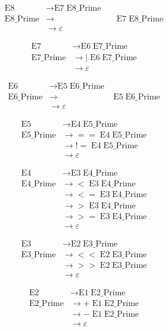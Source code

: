 \begin{align*}
\text{E8}
  &\to \text{E7}\;\text{E8\_Prime}\\[6pt]
\text{E8\_Prime}
  &\to &&\;\text{E7}\;\text{E8\_Prime}\\
  &\to \varepsilon
\end{align*}

\begin{align*}
\text{E7}
  &\to \text{E6}\;\text{E7\_Prime}\\[6pt]
\text{E7\_Prime}
  &\to |\;\text{E6}\;\text{E7\_Prime}\\
  &\to \varepsilon
\end{align*}

\begin{align*}
\text{E6}
  &\to \text{E5}\;\text{E6\_Prime}\\[6pt]
\text{E6\_Prime}
  &\to &\;\text{E5}\;\text{E6\_Prime}\\
  &\to \varepsilon
\end{align*}

\begin{align*}
\text{E5}
  &\to \text{E4}\;\text{E5\_Prime}\\[6pt]
\text{E5\_Prime}
  &\to ==\;\text{E4}\;\text{E5\_Prime}\\
  &\to !=\;\text{E4}\;\text{E5\_Prime}\\
  &\to \varepsilon
\end{align*}

\begin{align*}
\text{E4}
  &\to \text{E3}\;\text{E4\_Prime}\\[6pt]
\text{E4\_Prime}
  &\to <\;\text{E3}\;\text{E4\_Prime}\\
  &\to <=\;\text{E3}\;\text{E4\_Prime}\\
  &\to >\;\text{E3}\;\text{E4\_Prime}\\
  &\to >=\;\text{E3}\;\text{E4\_Prime}\\
  &\to \varepsilon
\end{align*}

\begin{align*}
\text{E3}
  &\to \text{E2}\;\text{E3\_Prime}\\[6pt]
\text{E3\_Prime}
  &\to <<\;\text{E2}\;\text{E3\_Prime}\\
  &\to >>\;\text{E2}\;\text{E3\_Prime}\\
  &\to \varepsilon
\end{align*}

\begin{align*}
\text{E2}
  &\to \text{E1}\;\text{E2\_Prime}\\[6pt]
\text{E2\_Prime}
  &\to +\;\text{E1}\;\text{E2\_Prime}\\
  &\to -\;\text{E1}\;\text{E2\_Prime}\\
  &\to \varepsilon
\end{align*}

